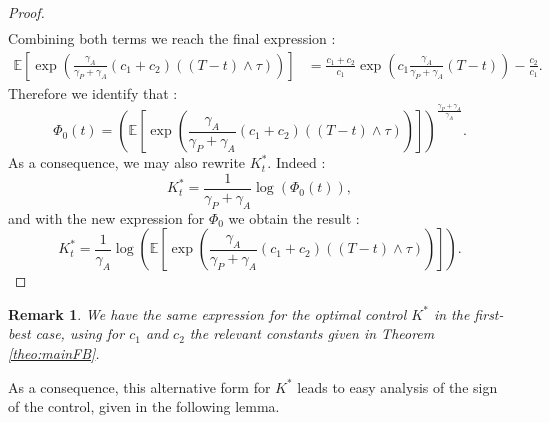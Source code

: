 \documentclass[numbook, envcountsect, envcountsame, envcountreset, runningheads, smallextended]{article}
\newtheorem{Remark}{Remark}[part]
\def \E{\mathbb{E}}
\begin{document}
\begin{proof}
\begin{align*}
\end{align*}
Combining both terms we reach the final expression : 
\begin{align*}
\E\left[\exp\left(\frac{\gamma_A}{\gamma_P+\gamma_A}(c_1+c_2)((T-t) \wedge \tau)\right)\right]  
&=  \frac{c_1 + c_2}{c_1} \exp\left(c_1 \frac{\gamma_A}{\gamma_P + \gamma_A}(T-t)\right) - \frac{c_2}{c_1}. 
\end{align*}
Therefore we identify that : 
$$ \Phi_0(t) = \left(\E\left[\exp\left(\frac{\gamma_A}{\gamma_P+\gamma_A}(c_1+c_2)((T-t) \wedge \tau)\right)\right]\right)^{\frac{\gamma_P+\gamma_A}{\gamma_A}}.$$
As a consequence, we may also rewrite $K^*_t.$ Indeed : 
 $$ K^*_t = \frac{1}{\gamma_P + \gamma_A} \log(\Phi_0(t)) ,$$
and with the new expression for $\Phi_0$ we obtain the result : 
$$ K_t^* =  \frac{1}{\gamma_A} \log\left(\E\left[\exp\left(\frac{\gamma_A}{\gamma_P+\gamma_A}(c_1+c_2)((T-t) \wedge \tau)\right)\right]\right).$$
\end{proof}

\begin{Remark}
We have the same expression for the optimal control $K^*$ in the first-best case, using for $c_1$ and $c_2$ the relevant constants given in Theorem \ref{theo:mainFB}.
\end{Remark}
As a consequence, this alternative form for $K^*$ leads to easy analysis of the sign of the control, given in the following lemma. 
\end{document}
